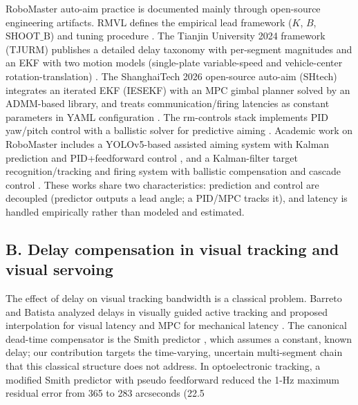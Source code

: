 \documentclass[journal]{IEEEtran}
\begin{document}
RoboMaster auto-aim practice is documented mainly through open-source engineering artifacts. RMVL defines the empirical lead framework ($K$, $B$, $\mathrm{SHOOT\_B}$) and tuning procedure \cite{ref1}. The Tianjin University 2024 framework (TJURM) publishes a detailed delay taxonomy with per-segment magnitudes and an EKF with two motion models (single-plate variable-speed and vehicle-center rotation-translation) \cite{ref2}. The ShanghaiTech 2026 open-source auto-aim (SHtech) integrates an iterated EKF (IESEKF) with an MPC gimbal planner solved by an ADMM-based library, and treats communication/firing latencies as constant parameters in YAML configuration \cite{ref3}. The rm-controls stack implements PID yaw/pitch control with a ballistic solver for predictive aiming \cite{ref4}. Academic work on RoboMaster includes a YOLOv5-based assisted aiming system with Kalman prediction and PID+feedforward control \cite{ref12}, and a Kalman-filter target recognition/tracking and firing system with ballistic compensation and cascade control \cite{ref13}. These works share two characteristics: prediction and control are decoupled (predictor outputs a lead angle; a PID/MPC tracks it), and latency is handled empirically rather than modeled and estimated.

\subsection*{B. Delay compensation in visual tracking and visual servoing}

The effect of delay on visual tracking bandwidth is a classical problem. Barreto and Batista analyzed delays in visually guided active tracking and proposed interpolation for visual latency and MPC for mechanical latency \cite{ref5}. The canonical dead-time compensator is the Smith predictor \cite{ref19}, which assumes a constant, known delay; our contribution targets the time-varying, uncertain multi-segment chain that this classical structure does not address. In optoelectronic tracking, a modified Smith predictor with pseudo feedforward reduced the 1-Hz maximum residual error from 365 to 283 arcseconds (22.5%
\end{document}
